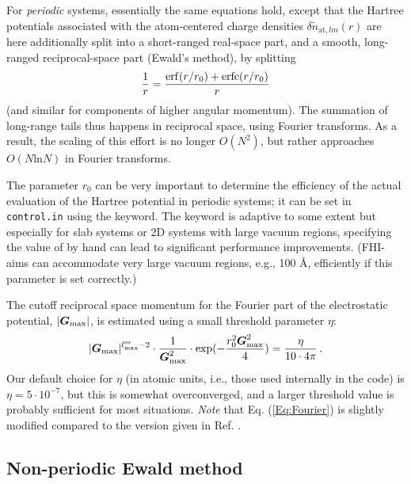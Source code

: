 For \emph{periodic} systems, essentially the same equations hold,
except that the Hartree potentials associated with the atom-centered 
charge densities $\delta\tilde{n}_{\text{at},lm}(r)$ are here
additionally split into a short-ranged real-space part, and a smooth,
long-ranged reciprocal-space part (Ewald's method), by splitting
\begin{equation}\label{Eq:Ewald}
  \frac{1}{r} = \frac{\mathop{\mathrm{erf}}(r/r_0)+\mathop{\mathrm{erfc}}(r/r_0)}{r} 
\end{equation}
(and similar for components of higher angular momentum).
The summation of long-range tails thus happens in reciprocal space,
using Fourier transforms. As a result, the scaling of this effort is
no longer $O(N^2)$, but rather approaches $O(N \mathrm{ln} N)$ in
Fourier transforms.

The parameter $r_0$ can be very important to determine the efficiency of the 
actual evaluation of the Hartree potential in periodic systems; it can be 
set in \texttt{control.in} using the
 keyword. The keyword is
adaptive to some extent but especially for slab systems or 2D systems
with large vacuum regions, specifying the value of
 by hand can lead to
significant performance improvements. (FHI-aims can accommodate very
large vacuum regions, e.g., 100 {\AA}, efficiently if this parameter is
set correctly.) 

The cutoff reciprocal space momentum for the Fourier part of the
electrostatic potential, $|\mbox{\boldmath$G$}_\text{max}|$, is estimated using a
small threshold parameter $\eta$:
\begin{equation}\label{Eq:Fourier}
  |\mbox{\boldmath$G$}_\text{max}|^{l_\text{max}^\text{es}-2} \cdot
  \frac{1}{\mbox{\boldmath$G$}_\text{max}^2} \cdot \exp(-\frac{r_0^2
  \mbox{\boldmath$G$}_\text{max}^2}{4}) = \frac{\eta}{10\cdot 4\pi} \, .
\end{equation}
Our default choice for $\eta$ (in atomic units, i.e., those used internally in
the code) is $\eta=5\cdot 10^{-7}$, but this is somewhat overconverged, and a
larger threshold value is probably sufficient for most situations. \emph{Note}
that Eq. (\ref{Eq:Fourier}) is slightly modified compared to the version given
in Ref. \cite{Blum08}.



\subsection{Non-periodic Ewald method}
\label{Sec:Hartree-non-periodic-ewald}

